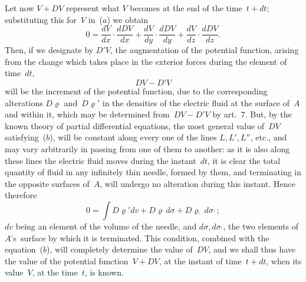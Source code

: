 \documentclass[11pt,notitlepage]{amsart}
\renewcommand{\rho}{\varrho}
\begin{document}
Let now $V+DV$ represent what $V$ becomes at the end of the time~$t+dt$;
substituting this for~$V$ in~($a$) we obtain
\[
\tag{$b$.}
0=
\frac{dV}{dx}\cdot\frac{dDV}{dx}
+\frac{dV}{dy}\cdot\frac{dDV}{dy}
+\frac{dV}{dz}\cdot\frac{dDV}{dz}.
\]
Then, if we designate by $D'V$, the augmentation of the potential function,
arising from the change which takes place in the exterior forces during the
element of time~$dt$,
\[
DV-D'V
\]
will be the increment of the potential function, due to the corresponding
alterations $D\rho$ and~$D\rho'$
in the densities of the electric fluid at the surface of~$A$
and within it, which may be determined from~${DV-D'V}$ by art.~7. But,
by the known theory of partial differential equations, the most general value 
of~$DV$ satisfying~($b$),
will be constant along every one of the lines $L, L', L''$, etc.,
and may vary arbitrarily in passing from one of them to another: as it is
also along these lines the electric fluid moves during the instant~$dt$,
it is clear
the total quantity of fluid in any infinitely thin needle, formed by them, and
terminating in the opposite surfaces of~$A$, will undergo no alteration during
this instant. Hence therefore
\[
\tag{$c$.}
0=\int D\rho'dv+D\rho\,d\sigma+D\rho_\prime\,d\sigma_\prime\,;
\]
$dv$ being an element of the volume of the needle,
and $d\sigma,d\sigma_\prime$, the two elements
of $A$'s~surface by which it is terminated. This condition, combined
with the equation~($b$), will completely determine the value of~$DV$, and we
shall thus have the value of the potential function~$V+DV$, at the instant of
time~$t+dt$, when its value~$V$, at the time~$t$, is known.
\end{document}
